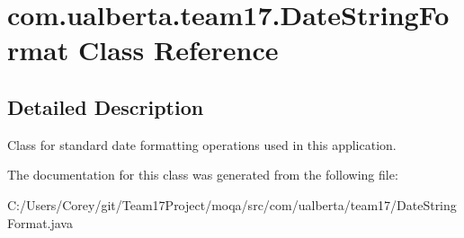 \hypertarget{classcom_1_1ualberta_1_1team17_1_1_date_string_format}{\section{com.\+ualberta.\+team17.\+Date\+String\+Format Class Reference}
\label{classcom_1_1ualberta_1_1team17_1_1_date_string_format}
}


\subsection{Detailed Description}
Class for standard date formatting operations used in this application. 

The documentation for this class was generated from the following file\+:\begin{DoxyCompactItemize}
\item 
C\+:/\+Users/\+Corey/git/\+Team17\+Project/moqa/src/com/ualberta/team17/Date\+String\+Format.\+java\end{DoxyCompactItemize}
